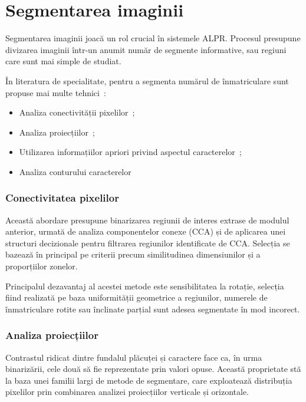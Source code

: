 \chapter{Segmentarea imaginii}\label{chap:segmentare}
\indent\par
Segmentarea imaginii joacă un rol crucial în sistemele ALPR. Procesul presupune divizarea imaginii într-un anumit număr de segmente informative, sau regiuni care sunt mai simple de studiat.

În literatura de specialitate, pentru a segmenta numărul de înmatriculare sunt propuse mai multe tehnici~\cite{SOAReview}:
\begin{itemize}
        \item{Analiza conectivității pixelilor~\cite{kanayama1991development}};
        \item{Analiza proiecțiilor}~\cite{HoughTransformation};
        \item{Utilizarea informațiilor apriori privind aspectul caracterelor}~\cite{sanyuan2004car};
        \item{Analiza conturului caracterelor}~\cite{capar2006concurrent}
\end{itemize}

\subsection{Conectivitatea pixelilor}
\indent\par
Această abordare presupune binarizarea regiunii de interes extrase de modulul anterior, urmată de analiza componentelor conexe (CCA) și de aplicarea unei structuri decizionale pentru filtrarea regiunilor identificate de CCA. Selecția se bazează în principal pe criterii precum similitudinea dimensiunilor și a proporțiilor zonelor.

Principalul dezavantaj al acestei metode este sensibilitatea la rotație, selecția fiind realizată pe baza uniformității geometrice a regiunilor, numerele de înmatriculare rotite sau înclinate parțial sunt adesea segmentate în mod incorect.

\subsection{Analiza proiecțiilor}
\indent\par
Contrastul ridicat dintre fundalul plăcuței și caractere face ca, în urma binarizării, cele două să fie reprezentate prin valori opuse. Această proprietate stă la baza unei familii largi de metode de segmentare, care exploatează distribuția pixelilor prin combinarea analizei proiecțiilor verticale și orizontale.

